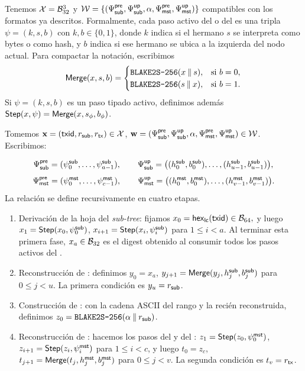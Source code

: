 Tenemos $\mathcal{X} = \mathcal{B}_{32}^3$ y $\mathcal{W} = \left\{(\Psi_{\mathsf{sub}}^{\mathsf{pre}}, \Psi_{\mathsf{sub}}^{\mathsf{up}}, \alpha, \Psi_{\mathsf{mst}}^{\mathsf{pre}}, \Psi_{\mathsf{mst}}^{\mathsf{up}})\right\}$ compatibles con los formatos ya descritos. Formalmente, cada paso activo del \SubPrefix o del \MasterPrefix es una tripla $\psi = (k, s, b)$ con $k,b \in \{0,1\}$, donde $k$ indica si el hermano $s$ se interpreta como bytes o como hash, y $b$ indica si ese hermano se ubica a la izquierda del nodo actual. Para compactar la notación, escribimos
$$\mathsf{Merge}(x,s,b) = \begin{cases}
  \texttt{BLAKE2S-256}(x \mathbin{\|} s), & \text{si } b = 0,\\
  \texttt{BLAKE2S-256}(s \mathbin{\|} x), & \text{si } b = 1.
\end{cases}$$
Si $\psi=(k,s,b)$ es un paso tipado activo, definimos además $\mathsf{Step}(x,\psi)=\mathsf{Merge}(x,s_\phi,b_\phi)$.

Tomemos $\mathbf{x} = (\mathsf{txid},r_{\mathsf{sub}},r_{\mathsf{tx}}) \in \mathcal{X}$, $\mathbf{w} = (\Psi_{\mathsf{sub}}^{\mathsf{pre}}, \Psi_{\mathsf{sub}}^{\mathsf{up}}, \alpha, \Psi_{\mathsf{mst}}^{\mathsf{pre}}, \Psi_{\mathsf{mst}}^{\mathsf{up}}) \in \mathcal{W}$.
Escribimos:

$$\Psi_{\mathsf{sub}}^{\mathsf{pre}} = (\psi^{\mathsf{sub}}_0,\ldots,\psi^{\mathsf{sub}}_{a-1}), \qquad \Psi_{\mathsf{sub}}^{\mathsf{up}} = \bigl((h^{\mathsf{sub}}_0,b^{\mathsf{sub}}_0),\ldots,(h^{\mathsf{sub}}_{u-1},b^{\mathsf{sub}}_{u-1})\bigr),$$
$$\Psi_{\mathsf{mst}}^{\mathsf{pre}} = (\psi^{\mathsf{mst}}_0,\ldots,\psi^{\mathsf{mst}}_{c-1}), \qquad \Psi_{\mathsf{mst}}^{\mathsf{up}} = \bigl((h^{\mathsf{mst}}_0,b^{\mathsf{mst}}_0),\ldots,(h^{\mathsf{mst}}_{v-1},b^{\mathsf{mst}}_{v-1})\bigr).$$
La relación \TxSnapshotMembershipRelation se define recursivamente en cuatro etapas.

\begin{enumerate}[itemsep=0.1cm]
	\item Derivación de la hoja del \textit{sub-tree}: fijamos $x_0 = \mathsf{hex}_{\mathsf{lc}}(\mathsf{txid}) \in \mathcal{B}_{64},$ y luego $x_1 = \mathsf{Step}(x_0,\psi^{\mathsf{sub}}_0)$, $x_{i+1} = \mathsf{Step}(x_i,\psi^{\mathsf{sub}}_i)$ para $1 \leq i < a$.
	Al terminar esta primera fase, $x_a \in \mathcal{B}_{32}$ es el digest obtenido al consumir todos los pasos activos del \SubPrefix.
	\item Reconstrucción de \SnapshotSubRoot: definimos $y_0 = x_a$, $y_{j+1} = \mathsf{Merge}(y_j,h^{\mathsf{sub}}_j,b^{\mathsf{sub}}_j)$ para $0 \leq j < u$. La primera condición es $y_u = r_{\mathsf{sub}}$.
	\item Construcción de \MasterLeaf: con la cadena ASCII del rango y la \SnapshotSubRoot recién reconstruida, definimos $z_0 = \texttt{BLAKE2S-256}(\alpha \mathbin{\|} r_{\mathsf{sub}})$.
	\item Reconstrucción de \TxSetRoot: hacemos los pasos del \MasterPrefix y del \MasterUpper: $z_1 = \mathsf{Step}(z_0,\psi^{\mathsf{mst}}_0)$, $z_{i+1} = \mathsf{Step}(z_i,\psi^{\mathsf{mst}}_i)$ para $1 \leq i < c$, y luego $t_0 = z_c$, $t_{j+1} = \mathsf{Merge}(t_j,h^{\mathsf{mst}}_j,b^{\mathsf{mst}}_j)$ para $0 \leq j < v$. La segunda condición es $t_v = r_{\mathsf{tx}}$.
\end{enumerate}

